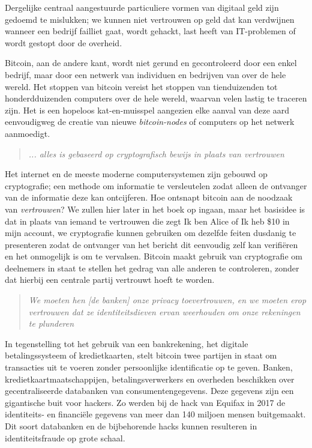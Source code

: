 \documentclass[smalldemyvopaper,11pt,twoside,onecolumn,openright,extrafontsizes]{memoir}
\begin{document}
Dergelijke centraal aangestuurde particuliere vormen van digitaal geld zijn gedoemd te mislukken; we kunnen niet vertrouwen op geld dat kan verdwijnen wanneer een bedrijf failliet gaat, wordt gehackt, last heeft van IT-problemen of wordt gestopt door de overheid.

Bitcoin, aan de andere kant, wordt niet gerund en gecontroleerd door een enkel bedrijf, maar door een netwerk van individuen en bedrijven van over de hele wereld. Het stoppen van bitcoin vereist het stoppen van tienduizenden tot honderdduizenden computers over de hele wereld, waarvan velen lastig te traceren zijn. Het is een hopeloos kat-en-muisspel aangezien elke aanval van deze aard eenvoudigweg de creatie van nieuwe \textit{bitcoin-nodes} of computers op het netwerk aanmoedigt.

\begin{quote}
\textit{ ... alles is gebaseerd op cryptografisch bewijs in plaats van vertrouwen}
\end{quote}

Het internet en de meeste moderne computersystemen zijn gebouwd op cryptografie; een methode om informatie te versleutelen zodat alleen de ontvanger van de informatie deze kan ontcijferen. Hoe ontsnapt bitcoin aan de noodzaak van \textit{vertrouwen}? We zullen hier later in het boek op ingaan, maar het basisidee is dat in plaats van iemand te vertrouwen die zegt \textquotedbl{}Ik ben Alice\textquotedbl{} of \textquotedbl{}Ik heb \$10 in mijn account\textquotedbl{}, we cryptografie kunnen gebruiken om dezelfde feiten dusdanig te presenteren zodat de ontvanger van het bericht dit eenvoudig zelf kan verifiëren en het onmogelijk is om te vervalsen. Bitcoin maakt gebruik van cryptografie om deelnemers in staat te stellen het gedrag van alle anderen te controleren, zonder dat hierbij een centrale partij vertrouwt hoeft te worden.

\begin{quote}
\textit{We moeten hen [de banken] onze privacy toevertrouwen, en we moeten erop vertrouwen dat ze identiteitsdieven ervan weerhouden om onze rekeningen te plunderen}
\end{quote}

In tegenstelling tot het gebruik van een bankrekening, het digitale betalingssysteem of kredietkaarten, stelt bitcoin twee partijen in staat om transacties uit te voeren zonder persoonlijke identificatie op te geven. Banken, kredietkaartmaatschappijen, betalingsverwerkers en overheden beschikken over gecentraliseerde databanken van consumentengegevens. Deze gegevens zijn een gigantische buit voor hackers. Zo werden bij de hack van Equifax in 2017 de identiteits- en financiële gegevens van meer dan 140 miljoen mensen buitgemaakt. Dit soort databanken en de bijbehorende hacks kunnen resulteren in identiteitsfraude op grote schaal. 
\end{document}
